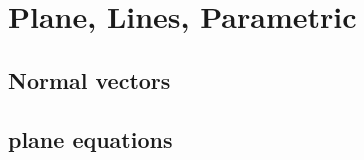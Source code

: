 \section{Plane, Lines, Parametric}
\noindent{}
\subsection{Normal vectors}
\subsection{plane equations}

\newpage
